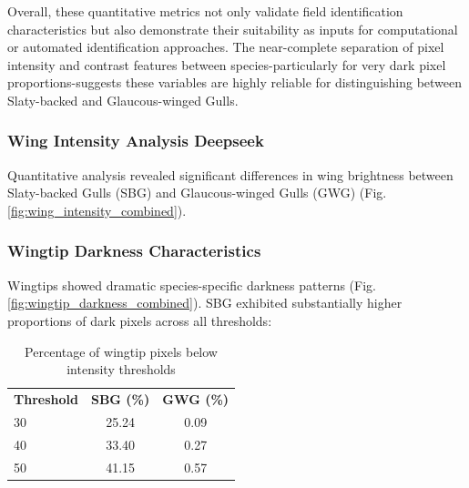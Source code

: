 \documentclass[a4paper,12pt]{report}
\begin{document}
Overall, these quantitative metrics not only validate field identification characteristics but also demonstrate their suitability as inputs for computational or automated identification approaches. The near-complete separation of pixel intensity and contrast features between species-particularly for very dark pixel proportions-suggests these variables are highly reliable for distinguishing between Slaty-backed and Glaucous-winged Gulls.




\subsubsection{Wing Intensity Analysis Deepseek}
Quantitative analysis revealed significant differences in wing brightness between Slaty-backed Gulls (SBG) and Glaucous-winged Gulls (GWG) (Fig. \ref{fig:wing_intensity_combined}).


\subsubsection{Wingtip Darkness Characteristics}
Wingtips showed dramatic species-specific darkness patterns (Fig. \ref{fig:wingtip_darkness_combined}). SBG exhibited substantially higher proportions of dark pixels across all thresholds:

\begin{table}[H]
\centering
\caption{Percentage of wingtip pixels below intensity thresholds}
\label{tab:pixel_thresholds}
\begin{tabular}{lcc}
\hline
\textbf{Threshold} & \textbf{SBG (\%)} & \textbf{GWG (\%)} \\
30 & 25.24 & 0.09 \\
40 & 33.40 & 0.27 \\
50 & 41.15 & 0.57 \\
\end{tabular}
\end{table}
\end{document}

